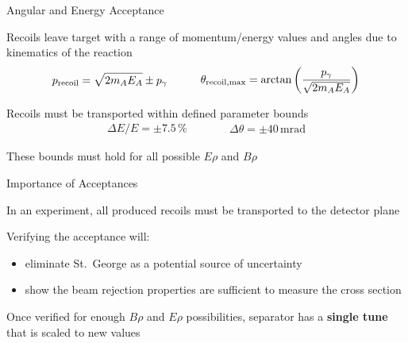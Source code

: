 \documentclass[10pt]{beamer}
\begin{document}
\begin{frame}[fragile]{Angular and Energy Acceptance}

    Recoils leave target with a range of momentum/energy values and angles due to kinematics of the reaction
    \[
        \begin{split}
            p_{\rm recoil} = \sqrt{2m_AE_A} \pm p_{\gamma}
        \end{split}
        \quad\quad\quad
        \begin{split}
            \theta_{\rm recoil, max} = \arctan\left(\frac{p_{\gamma}}{\sqrt{2m_AE_A}}\right)
        \end{split}
    \]

    Recoils must be transported within defined parameter bounds
    \[
        \begin{split}
            \Delta E/E = \pm7.5\,\%
        \end{split}
        \quad\quad\quad
        \begin{split}
            \Delta\theta = \pm40\,\text{mrad}
        \end{split}
    \]

    These bounds must hold for all possible $E\rho$ and $B\rho$

\end{frame}

\begin{frame}[fragile]{Importance of Acceptances}

    In an experiment, all produced recoils must be transported to the detector plane

    Verifying the acceptance will:
    \begin{itemize}
        \item eliminate St.\ George as a potential source of uncertainty
        \item show the beam rejection properties are sufficient to measure the cross section
    \end{itemize}


    Once verified for enough $B\rho$ and $E\rho$
    possibilities, separator has a \textbf{single tune} that is scaled to new values

\end{frame}
\end{document}
